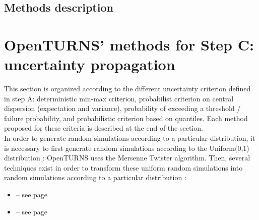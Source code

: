 \subsection{Methods description}


\newpage

\newpage

\newpage

\newpage

\newpage

\newpage

\newpage

\newpage

\newpage

\newpage

\newpage

\newpage

\newpage

\newpage

\newpage

\newpage

\newpage
%
\newpage

\newpage

\newpage

\newpage

\newpage

\newpage

\newpage

\section{OpenTURNS' methods for Step C: uncertainty propagation}

This section is organized according to the different uncertainty criterion defined in step A: deterministic min-max criterion, probabilist criterion on central dispersion (expectation and variance), probability of exceeding a threshold / failure probability, and probabilistic criterion based on quantiles. Each method proposed for these criteria is described at the end of the section. \\

In order to generate random simulations according to a particular distribution, it is necessary to first generate random simulations according to the Uniform(0,1) distribution : OpenTURNS uses the Mersenne Twister algorithm. Then, several techniques exist in order to transform these uniform random simulations into random simulations according to a particular distribution :

\begin{itemize}

\item {} -- see page \pageref{docref_C_UniformRandomGenerator} \vspace{2mm}
\item {} -- see page \pageref{docref_C_DistributionRealisations} \vspace{2mm}

\end{itemize}

